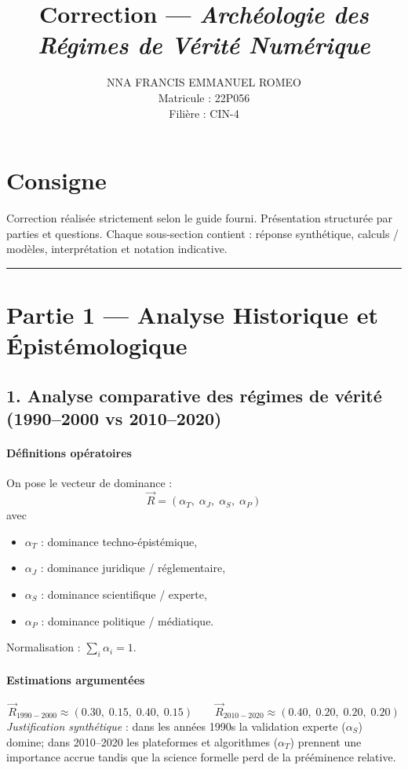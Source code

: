\documentclass[11pt,a4paper]{article}
\title{Correction — \textit{Archéologie des Régimes de Vérité Numérique}}
\author{NNA FRANCIS EMMANUEL ROMEO \\ Matricule : 22P056 \\ Filière : CIN-4}
\date{\vspace{-5ex}}
\begin{document}
\maketitle
\thispagestyle{empty}

\section*{Consigne}
Correction réalisée strictement selon le guide fourni. Présentation structurée par parties et questions. Chaque sous-section contient : réponse synthétique, calculs / modèles, interprétation et notation indicative.

\bigskip
\hrule
\bigskip

\section{Partie 1 — Analyse Historique et Épistémologique}

\subsection{1. Analyse comparative des régimes de vérité (1990--2000 vs 2010--2020)}

\paragraph{Définitions opératoires}
On pose le vecteur de dominance :
\[
\vec R = (\alpha_T,\;\alpha_J,\;\alpha_S,\;\alpha_P)
\]
avec
\begin{itemize}[noitemsep]
  \item $\alpha_T$ : dominance techno-épistémique,
  \item $\alpha_J$ : dominance juridique / réglementaire,
  \item $\alpha_S$ : dominance scientifique / experte,
  \item $\alpha_P$ : dominance politique / médiatique.
\end{itemize}
Normalisation : $\sum_i \alpha_i = 1$.

\paragraph{Estimations argumentées}
\[
\vec R_{1990-2000} \approx (0.30,\;0.15,\;0.40,\;0.15)
\qquad
\vec R_{2010-2020} \approx (0.40,\;0.20,\;0.20,\;0.20)
\]
\textit{Justification synthétique} : dans les années 1990s la validation experte (\(\alpha_S\)) domine; dans 2010–2020 les plateformes et algorithmes (\(\alpha_T\)) prennent une importance accrue tandis que la science formelle perd de la prééminence relative.
\end{document}
